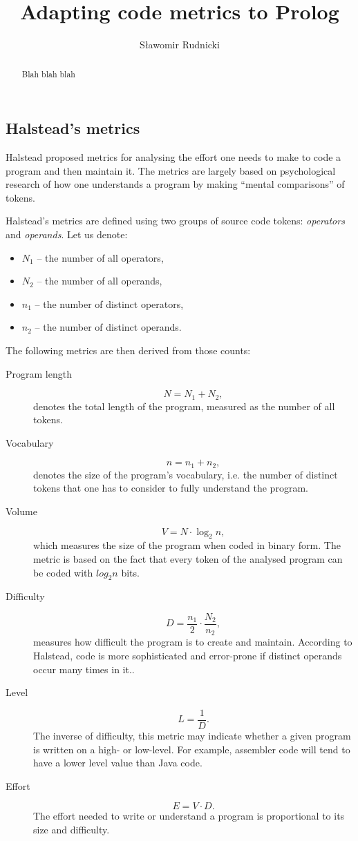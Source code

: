 \documentclass[11pt,a4paper,twoside]{article}
\author{Sławomir Rudnicki}
\title{Adapting code metrics to Prolog}
\date{}
\begin{document}
\maketitle
\begin{abstract}
Blah blah blah
\end{abstract}
\begin{multicols}{2}

\section{Halstead's metrics}

Halstead \cite{halstead} proposed metrics for analysing the effort one
needs to make to code a program and then maintain it. The metrics are
largely based on psychological research of how one understands a
program by making ``mental comparisons'' of tokens.

Halstead's metrics are defined using two groups of source code tokens:
\emph{operators} and \emph{operands}. Let us denote:
\begin{itemize}
\item $N_1$ -- the number of all operators, 
\item $N_2$ -- the number of all operands, 
\item $n_1$ -- the number of distinct operators, 
\item $n_2$ -- the number of distinct operands.
\end{itemize}

The following metrics are then derived from those counts:
\begin{description}
\item[Program length]
  $$N = N_1 + N_2,$$ denotes the total length of the program, measured
  as the number of all tokens.
\item[Vocabulary]
  $$n = n_1 + n_2,$$ denotes the size of the program's vocabulary,
  i.e.  the number of distinct tokens that one has to consider to
  fully understand the program.
\item[Volume]
  $$V = N \cdot \log_2n,$$ which measures the size of the program when
  coded in binary form. The metric is based on the fact that every
  token of the analysed program can be coded with $log_2n$ bits.
\item[Difficulty]
  $$D = \frac{n_1}{2}\cdot\frac{N_2}{n_2},$$ measures how difficult
  the program is to create and maintain. According to Halstead, code
  is more sophisticated and error-prone if distinct operands occur
  many times in it..
\item[Level]
  $$L = \frac{1}{D}.$$ The inverse of difficulty, this metric may
  indicate whether a given program is written on a high- or
  low-level. For example, assembler code will tend to have a lower
  level value than Java code.
\item[Effort]
  $$E = V \cdot D.$$ The effort needed to write or understand a
  program is proportional to its size and difficulty.
\end{description}


\end{multicols}
\end{document}
